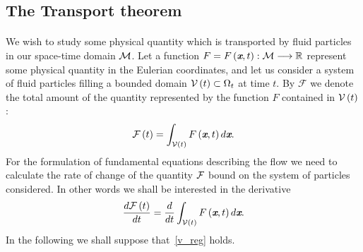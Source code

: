 \subsection{The Transport theorem}
\paragraph{}
We wish to study some physical quantity which is transported by fluid particles in our space-time domain $\mathcal{M}$.
Let a function $F = F\left(\textit{\textbf{x}},t\right):\mathcal{M}\longrightarrow \mathbb{R} $ represent some physical quantity in the Eulerian coordinates, and let us consider a system of fluid particles filling a bounded domain $\mathcal{V}\left({t}\right) \subset \Omega_{t}$ at time $t$. By $\mathcal{F}$ we denote the total amount of the quantity represented by the function $F$ contained in $\mathcal{V}\left({t}\right) $:
\begin{equation}
 \mathcal{F}\left(t\right) = \int_{\mathcal{V}\left(t\right)}F\left(\textit{\textbf{x}},t\right)d\textit{\textbf{x}}.
\end{equation}
For the formulation of fundamental equations describing the flow we need to calculate the rate of change of the quantity $\mathcal{F}$ bound on the system of particles considered. In other words we shall be interested in the derivative
\begin{equation}\label{f_der}
 \frac{d{\mathcal{F}\left(t\right)}}{d{t}}=\frac{d{}}{d{t}}\int_{\mathcal{V}\left(t\right)}F\left(\textit{\textbf{x}},t\right)d\textit{\textbf{x}}.
\end{equation}
In the following we shall suppose that~\eqref{v_reg} holds.
